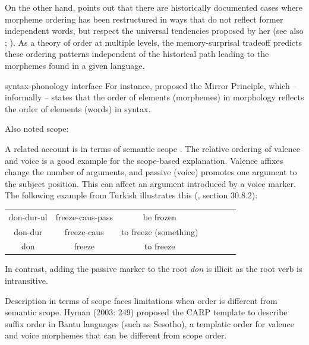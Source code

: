 \documentclass[11pt,letterpaper]{article}
\begin{document}
On the other hand, \citet{bybee-morphology-1985} points out that there are historically documented cases where morpheme ordering has been restructured in ways that do not reflect former independent words, but respect the universal tendencies proposed by her (see also \citet{mithun2000the, haspelmath1993the, mithun1995affixation}; \citet[Section 15]{rice2000morpheme}).
As a theory of order at multiple levels, the memory-surprisal tradeoff predicts these ordering patterns independent of the historical path leading to the morphemes found in a given language.



syntax-phonology interface \citep{baker1985the} 
For instance, 
\cite{baker1985the} proposed the Mirror Principle, which -- informally -- states that the order of elements (morphemes) in morphology reflects the order of elements (words) in syntax.

Also noted scope: \citep{baker1988incorporation,foley1984functional,chierchia1990meaning,valin1992a}





A related account is in terms of semantic scope \cite{rice2000morpheme}.
The relative ordering of valence and voice is a good example for the scope-based explanation.
Valence affixes change the number of arguments, and passive (voice) promotes one argument to the subject position.
This can affect an argument introduced by a voice marker.
The following example from Turkish illustrates this (\cite{schaaik2020turkish}, section 30.8.2):

\begin{tabular}{ccccccc}
don-dur-ul & freeze-caus-pass & be frozen \\
don-dur & freeze-caus & to freeze (something) \\
don & freeze& to freeze \\
\end{tabular}

In contrast, adding the passive marker to the root \textit{don} is illicit as the root verb is intransitive.

Description in terms of scope faces limitations when order is different from semantic scope.
Hyman  (2003:  249) proposed the CARP template to describe suffix order in Bantu languages (such as Sesotho), a templatic order for valence and voice morphemes that can be different from scope order.
\end{document}
